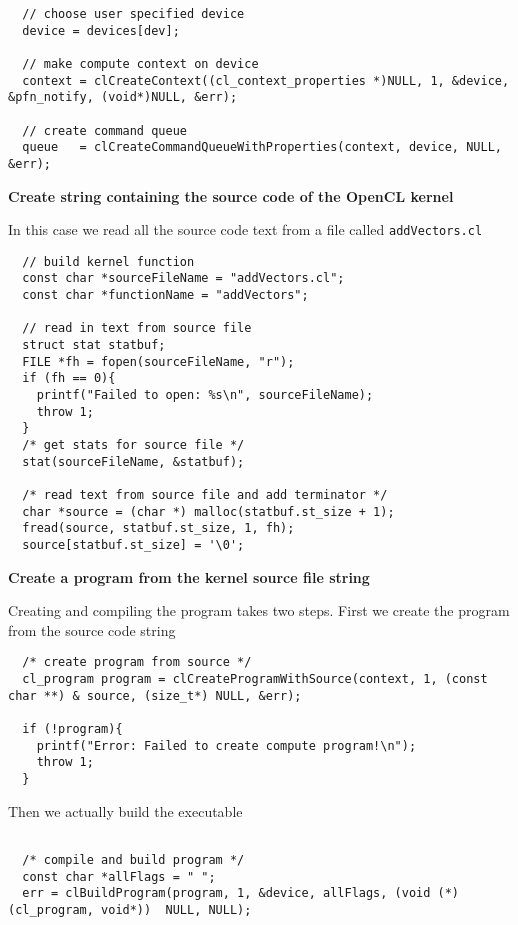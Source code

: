 \begin{verbatim}
  // choose user specified device                               
  device = devices[dev];

  // make compute context on device                              
  context = clCreateContext((cl_context_properties *)NULL, 1, &device, &pfn_notify, (void*)NULL, &err);

  // create command queue            
  queue   = clCreateCommandQueueWithProperties(context, device, NULL, &err);
\end{verbatim}

{\bf Create string containing the source code of the OpenCL kernel}

In this case we read all the source code text from a file called \texttt{addVectors.cl}
\begin{verbatim}
  // build kernel function                                 
  const char *sourceFileName = "addVectors.cl";
  const char *functionName = "addVectors";

  // read in text from source file      
  struct stat statbuf;
  FILE *fh = fopen(sourceFileName, "r");
  if (fh == 0){
    printf("Failed to open: %s\n", sourceFileName);
    throw 1;
  }
  /* get stats for source file */
  stat(sourceFileName, &statbuf);

  /* read text from source file and add terminator */
  char *source = (char *) malloc(statbuf.st_size + 1);
  fread(source, statbuf.st_size, 1, fh);
  source[statbuf.st_size] = '\0';
\end{verbatim}

{\bf Create a program from the kernel source file string}

Creating and compiling the program takes two steps. First we create the program from the source code string
\begin{verbatim}
  /* create program from source */
  cl_program program = clCreateProgramWithSource(context, 1, (const char **) & source, (size_t*) NULL, &err);

  if (!program){
    printf("Error: Failed to create compute program!\n");
    throw 1;
  }
  \end{verbatim}
  
  Then we actually build the executable
  
  \begin{verbatim}

  /* compile and build program */
  const char *allFlags = " ";
  err = clBuildProgram(program, 1, &device, allFlags, (void (*)(cl_program, void*))  NULL, NULL);
\end{verbatim}


